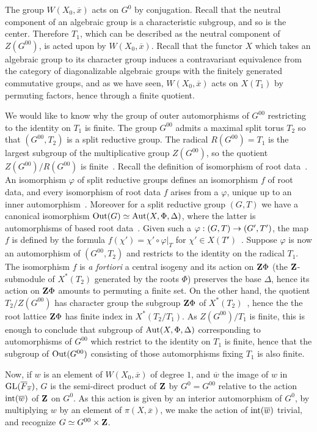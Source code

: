 \documentclass[deligne.tex]{subfiles}
\begin{document}
The group $W(X_0,\overline x)$ acts on $G^0$ by conjugation. Recall that
the neutral component of an algebraic group is a characteristic subgroup,
and so is the center. Therefore $T_1$, which can be described as 
the neutral component of $Z(G^{00})$, is acted upon by $W(X_0,\overline x)$.
Recall that the functor $X$ which takes an algebraic group to its character
group induces a contravariant equivalence from the category of 
diagonalizable algebraic groups with the finitely generated commutative 
groups, and as we have seen, $W(X_0,\overline x)$ acts on $X(T_1)$ by
permuting factors, hence through a finite quotient.

We would like to know why the group of outer automorphisms of $G^{00}$
restricting to the identity on $T_1$ is finite.
The group $G^{00}$ admits a maximal split torus $T_2$
so that $(G^{00},T_2)$ is a split reductive group.
The radical $R(G^{00})=T_1$ is the 
largest subgroup of the multiplicative group $Z(G^{00})$, so the quotient
$Z(G^{00})/R(G^{00})$ is finite~\cite[19.10]{Milne}.
Recall the definition of isomorphism of root data~\cite[23.2]{Milne}.
An isomorphism $\varphi$ of split reductive groups defines an isomorphism
$f$ of root data, and every isomorphism of root data $f$ arises from a
$\varphi$, unique up to an inner automorphism~\cite[23.26]{Milne}.
Moreover for a split reductive group $(G,T)$ we have a canonical isomorphism 
$\operatorname{Out}(G)\simeq\operatorname{Aut}(X,\Phi,\Delta)$, where the latter is automorphisms
of based root data~\cite[23.46]{Milne}.
Given such a $\varphi:(G,T)\rightarrow(G',T')$, the map $f$ is defined by the formula
$f(\chi')=\chi'\circ\varphi|_T$ for $\chi'\in X(T')$~\cite[23.5]{Milne}.
Suppose $\varphi$ is now an automorphism of $(G^{00},T_2)$ and
restricts to the identity on the radical $T_1$. The isomorphism $f$ is 
\emph{a fortiori} a central isogeny and its action on $\mathbf{Z}\Phi$
(the $\mathbf{Z}$-submodule of $X^\ast(T_2)$ generated by the roots $\Phi$)
preserves the base $\Delta$, hence its action on $\mathbf{Z}\Phi$ amounts to
permuting a finite set.
On the other hand, the quotient $T_2/Z(G^{00})$ has character group the
subgroup $\mathbf{Z}\Phi$ of $X^\ast(T_2)$~\cite[21.9]{Milne}, hence the
the root lattice $\mathbf{Z}\Phi$ has finite index in $X^\ast(T_2/T_1)$.
As $Z(G^{00})/T_1$ is finite, this is enough to conclude that subgroup of
$\operatorname{Aut}(X,\Phi,\Delta)$ corresponding to automorphisms of $G^{00}$ which
restrict to the identity on $T_1$ is finite, hence that the subgroup of
$\operatorname{Out}(G^{00})$ consisting of those automorphisms fixing $T_1$ is also
finite.

Now, if $w$ is an element of $W(X_0,\overline x)$ of degree $1$, and
$\overline w$ the image of $w$ in $\operatorname{GL}(\overline F_{\overline x})$,
$G$ is the semi-direct product of $\mathbf{Z}$ by $G^0=G^{00}$ relative to the
action $\operatorname{int}(\overline w)$ of $\mathbf{Z}$ on $G^0$. As this action is given
by an interior automorphism of $G^0$, by multiplying $w$ by an element of
$\pi(X,\overline x)$, we make the action of $\operatorname{int}(\overline w)$
trivial, and recognize $G\simeq G^{00}\times\mathbf{Z}$.
\end{document}
